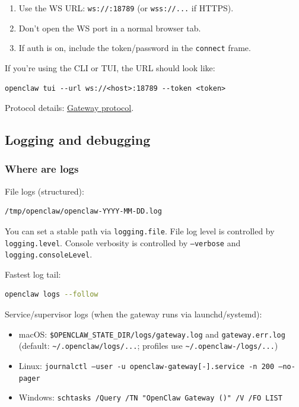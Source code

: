 \begin{enumerate}
  \item Use the WS URL: \texttt{ws://:18789} (or \texttt{wss://...} if HTTPS).
  \item Don't open the WS port in a normal browser tab.
  \item If auth is on, include the token/password in the \texttt{connect} frame.
\end{enumerate}


If you're using the CLI or TUI, the URL should look like:

\begin{lstlisting}
openclaw tui --url ws://<host>:18789 --token <token>
\end{lstlisting}


Protocol details: \href{/gateway/protocol}{Gateway protocol}.

\subsection{Logging and debugging}


\subsubsection{Where are logs}


File logs (structured):

\begin{lstlisting}
/tmp/openclaw/openclaw-YYYY-MM-DD.log
\end{lstlisting}


You can set a stable path via \texttt{logging.file}. File log level is controlled by \texttt{logging.level}. Console verbosity is controlled by \texttt{--verbose} and \texttt{logging.consoleLevel}.

Fastest log tail:

\begin{lstlisting}[language=bash]
openclaw logs --follow
\end{lstlisting}


Service/supervisor logs (when the gateway runs via launchd/systemd):

\begin{itemize}
  \item macOS: \texttt{\$OPENCLAW\_STATE\_DIR/logs/gateway.log} and \texttt{gateway.err.log} (default: \texttt{\textasciitilde{}/.openclaw/logs/...}; profiles use \texttt{\textasciitilde{}/.openclaw-/logs/...})
  \item Linux: \texttt{journalctl --user -u openclaw-gateway[-].service -n 200 --no-pager}
  \item Windows: \texttt{schtasks /Query /TN "OpenClaw Gateway ()" /V /FO LIST}
\end{itemize}


